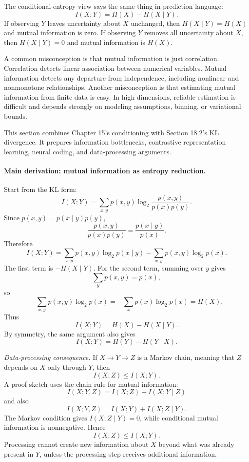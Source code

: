 The conditional-entropy view says the same thing in prediction language:
\[
I(X;Y)=H(X)-H(X\mid Y).
\]
If observing \(Y\) leaves uncertainty about \(X\) unchanged, then \(H(X\mid Y)=H(X)\) and mutual information is zero. If observing \(Y\) removes all uncertainty about \(X\), then \(H(X\mid Y)=0\) and mutual information is \(H(X)\).

A common misconception is that mutual information is just correlation. Correlation detects linear association between numerical variables. Mutual information detects any departure from independence, including nonlinear and nonmonotone relationships. Another misconception is that estimating mutual information from finite data is easy. In high dimensions, reliable estimation is difficult and depends strongly on modeling assumptions, binning, or variational bounds.

This section combines Chapter 15's conditioning with Section 18.2's KL divergence. It prepares information bottlenecks, contrastive representation learning, neural coding, and data-processing arguments.

\paragraph{Main derivation: mutual information as entropy reduction.}
Start from the KL form:
\[
I(X;Y)
=\sum_{x,y}p(x,y)\log_2\frac{p(x,y)}{p(x)p(y)}.
\]
Since \(p(x,y)=p(x\mid y)p(y)\),
\[
\frac{p(x,y)}{p(x)p(y)}
=\frac{p(x\mid y)}{p(x)}.
\]
Therefore
\[
I(X;Y)
=\sum_{x,y}p(x,y)\log_2 p(x\mid y)
-\sum_{x,y}p(x,y)\log_2 p(x).
\]
The first term is \(-H(X\mid Y)\). For the second term, summing over \(y\) gives
\[
\sum_y p(x,y)=p(x),
\]
so
\[
-\sum_{x,y}p(x,y)\log_2 p(x)
=-\sum_x p(x)\log_2 p(x)
=H(X).
\]
Thus
\[
\boxed{
I(X;Y)=H(X)-H(X\mid Y).
}
\]
By symmetry, the same argument also gives
\[
I(X;Y)=H(Y)-H(Y\mid X).
\]

\emph{Data-processing consequence.}
If \(X\to Y\to Z\) is a Markov chain, meaning that \(Z\) depends on \(X\) only through \(Y\), then
\[
\boxed{
I(X;Z)\le I(X;Y).
}
\]
A proof sketch uses the chain rule for mutual information:
\[
I(X;Y,Z)=I(X;Z)+I(X;Y\mid Z)
\]
and also
\[
I(X;Y,Z)=I(X;Y)+I(X;Z\mid Y).
\]
The Markov condition gives \(I(X;Z\mid Y)=0\), while conditional mutual information is nonnegative. Hence
\[
I(X;Z)\le I(X;Y).
\]
Processing cannot create new information about \(X\) beyond what was already present in \(Y\), unless the processing step receives additional information.

